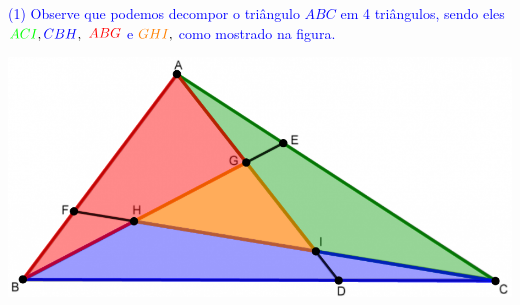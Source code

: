 \documentclass[oneside,a4paper,12pt]{article}
\newcommand{\negrito}[1]{\mbox{\boldmath{$#1$}}}
\theoremstyle{Colorido}
\theoremstyle{solu}
\theoremstyle{dotlessP}
\begin{document}
\textcolor{blue}{\begin{tasks}[counter-format={(tsk[a])},label-width=3.6ex, label-format = {\bfseries}, column-sep = {20pt}](1)
\task[\textcolor{blue}{$\negrito{(c)} $}] Observe que podemos decompor o triângulo $ABC$ em 4 triângulos, sendo eles $\textcolor{green}{ACI}, \textcolor{blue}{CBH},$ $\textcolor{red}{ABG}$ e $\textcolor{orange}{GHI},$ como mostrado na figura.
\end{tasks}}
\begin{center}
\includegraphics[scale=0.4]{Provas e Avaliações/Figuras avaliações/15avaliacaociclo3.png}
\end{center}
\end{document}
